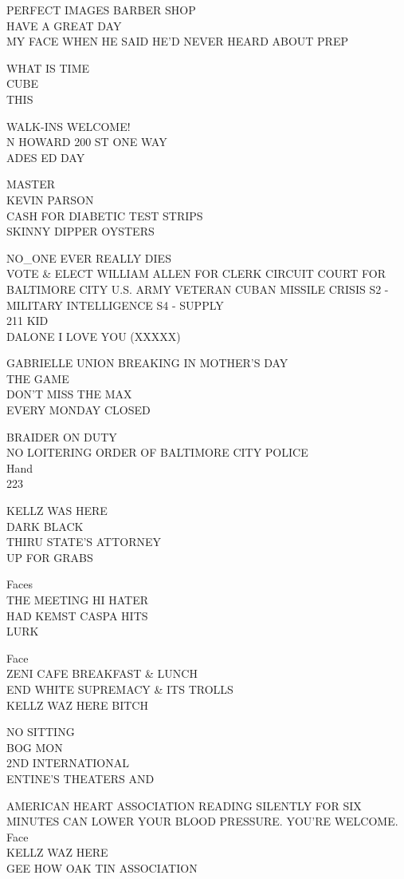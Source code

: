 \documentclass[10pt,letterpaper]{article}
\begin{document}
PERFECT IMAGES BARBER SHOP\\
HAVE A GREAT DAY\\
MY FACE WHEN HE SAID HE'D NEVER HEARD ABOUT PREP

WHAT IS TIME\\
CUBE\\
THIS

WALK{-}INS WELCOME!\\
N HOWARD 200 ST ONE WAY\\
ADES ED DAY

MASTER\\
KEVIN PARSON\\
CASH FOR DIABETIC TEST STRIPS\\
SKINNY DIPPER OYSTERS

NO\_ONE EVER REALLY DIES\\
VOTE \& ELECT WILLIAM ALLEN FOR CLERK CIRCUIT COURT FOR BALTIMORE CITY U.S. ARMY VETERAN CUBAN MISSILE CRISIS S2 {-} MILITARY INTELLIGENCE S4 {-} SUPPLY\\
211 KID\\
DALONE I LOVE YOU (XXXXX)

GABRIELLE UNION BREAKING IN MOTHER'S DAY\\
THE GAME\\
DON'T MISS THE MAX\\
EVERY MONDAY CLOSED

BRAIDER ON DUTY\\
NO LOITERING ORDER OF BALTIMORE CITY POLICE\\
Hand\\
223

KELLZ WAS HERE\\
DARK BLACK\\
THIRU STATE'S ATTORNEY\\
UP FOR GRABS

Faces\\
THE MEETING HI HATER\\
HAD KEMST CASPA HITS\\
LURK

Face\\
ZENI CAFE BREAKFAST \& LUNCH\\
END WHITE SUPREMACY \& ITS TROLLS\\
KELLZ WAZ HERE BITCH

NO SITTING\\
BOG MON\\
2ND INTERNATIONAL\\
ENTINE'S THEATERS AND

AMERICAN HEART ASSOCIATION READING SILENTLY FOR SIX MINUTES CAN LOWER YOUR BLOOD PRESSURE.  YOU'RE WELCOME.\\
Face\\
KELLZ WAZ HERE\\
GEE HOW OAK TIN ASSOCIATION
\end{document}
